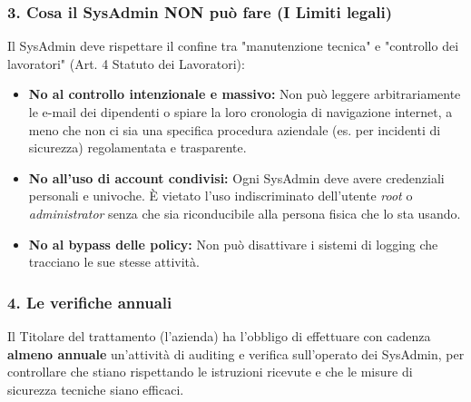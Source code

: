 \subsubsection*{3. Cosa il SysAdmin NON può fare (I Limiti legali)}
Il SysAdmin deve rispettare il confine tra "manutenzione tecnica" e "controllo dei lavoratori" (Art. 4 Statuto dei Lavoratori):
\begin{itemize}
    \item \textbf{No al controllo intenzionale e massivo:} Non può leggere arbitrariamente le e-mail dei dipendenti o spiare la loro cronologia di navigazione internet, a meno che non ci sia una specifica procedura aziendale (es. per incidenti di sicurezza) regolamentata e trasparente.
    \item \textbf{No all'uso di account condivisi:} Ogni SysAdmin deve avere credenziali personali e univoche. È vietato l'uso indiscriminato dell'utente \textit{root} o \textit{administrator} senza che sia riconducibile alla persona fisica che lo sta usando.
    \item \textbf{No al bypass delle policy:} Non può disattivare i sistemi di logging che tracciano le sue stesse attività.
\end{itemize}

\subsubsection*{4. Le verifiche annuali}
Il Titolare del trattamento (l'azienda) ha l'obbligo di effettuare con cadenza \textbf{almeno annuale} un'attività di auditing e verifica sull'operato dei SysAdmin, per controllare che stiano rispettando le istruzioni ricevute e che le misure di sicurezza tecniche siano efficaci.